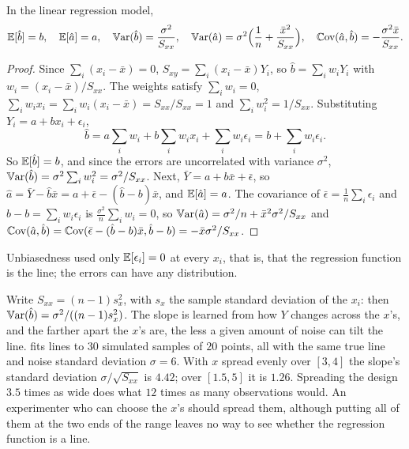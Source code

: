 \begin{proposition}
\label{prop:lse-moments}
In the linear regression model,
\[
\operatorname*{\mathbb{E}}[\hat{b}] = b, \quad \operatorname*{\mathbb{E}}[\hat{a}] = a, \quad \operatorname*{\mathbb{V}\text{ar}}(\hat{b}) = \frac{\sigma^2}{S_{xx}}, \quad \operatorname*{\mathbb{V}\text{ar}}(\hat{a}) = \sigma^2\Big(\frac1n + \frac{\bar{x}^2}{S_{xx}}\Big), \quad \operatorname*{\mathbb{C}\text{ov}}(\hat{a}, \hat{b}) = -\frac{\sigma^2\bar{x}}{S_{xx}}.
\]
\end{proposition}
\begin{proof}
Since $\sum_i (x_i - \bar{x}) = 0$, $S_{xy} = \sum_i (x_i - \bar{x})Y_i$, so $\hat{b} = \sum_i w_iY_i$ with $w_i = (x_i - \bar{x})/S_{xx}$.
The weights satisfy $\sum_i w_i = 0$, $\sum_i w_ix_i = \sum_i w_i(x_i - \bar{x}) = S_{xx}/S_{xx} = 1$ and $\sum_i w_i^2 = 1/S_{xx}$.
Substituting $Y_i = a + bx_i + \epsilon_i$,
\[
\hat{b} = a\sum_i w_i + b\sum_i w_ix_i + \sum_i w_i\epsilon_i = b + \sum_i w_i\epsilon_i.
\]
So $\operatorname*{\mathbb{E}}[\hat{b}] = b$, and since the errors are uncorrelated with variance $\sigma^2$, $\operatorname*{\mathbb{V}\text{ar}}(\hat{b}) = \sigma^2\sum_i w_i^2 = \sigma^2/S_{xx}$.
Next, $\bar{Y} = a + b\bar{x} + \bar{\epsilon}$, so $\hat{a} = \bar{Y} - \hat{b}\bar{x} = a + \bar{\epsilon} - (\hat{b} - b)\bar{x}$, and $\operatorname*{\mathbb{E}}[\hat{a}] = a$.
The covariance of $\bar{\epsilon} = \frac1n\sum_i \epsilon_i$ and $\hat{b} - b = \sum_i w_i\epsilon_i$ is $\frac{\sigma^2}{n}\sum_i w_i = 0$, so $\operatorname*{\mathbb{V}\text{ar}}(\hat{a}) = \sigma^2/n + \bar{x}^2\sigma^2/S_{xx}$ and $\operatorname*{\mathbb{C}\text{ov}}(\hat{a}, \hat{b}) = \operatorname*{\mathbb{C}\text{ov}}(\bar{\epsilon} - (\hat{b} - b)\bar{x}, \hat{b} - b) = -\bar{x}\sigma^2/S_{xx}$.
\end{proof}

Unbiasedness used only $\operatorname*{\mathbb{E}}[\epsilon_i] = 0$ at every $x_i$, that is, that the regression function is the line; the errors can have any distribution.

\begin{intuition}
Write $S_{xx} = (n - 1)s_x^2$, with $s_x$ the sample standard deviation of the $x_i$: then $\operatorname*{\mathbb{V}\text{ar}}(\hat{b}) = \sigma^2/((n - 1)s_x^2)$. The slope is learned from how $Y$ changes across the $x$'s, and the farther apart the $x$'s are, the less a given amount of noise can tilt the line.  fits lines to $30$ simulated samples of $20$ points, all with the same true line and noise standard deviation $\sigma = 6$. With $x$ spread evenly over $[3, 4]$ the slope's standard deviation $\sigma/\sqrt{S_{xx}}$ is $4.42$; over $[1.5, 5]$ it is $1.26$. Spreading the design $3.5$ times as wide does what $12$ times as many observations would. An experimenter who can choose the $x$'s should spread them, although putting all of them at the two ends of the range leaves no way to see whether the regression function is a line.
\end{intuition}

